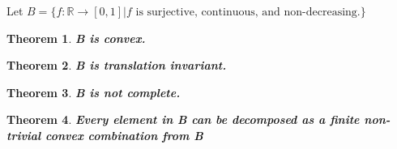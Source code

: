 \documentclass[12pt]{extarticle}
\theoremstyle{plain}
\newtheorem{thm}{Theorem}[section]
\theoremstyle{Definition}
\theoremstyle{Definition}
\theoremstyle{plain}
\begin{document}
	Let $B = \{f : \mathbb{R} \to [0,1] | f \text{ is surjective, continuous, and non-decreasing.}\}$ \\ 
	\begin{thm} \textbf{B is convex. } \\
		
	\end{thm}
	\begin{thm} \textbf{B is translation invariant.} \\
	
	\end{thm}
	\begin{thm} \textbf{B is not complete.} \\
	
	\end{thm}
	\begin{thm} \textbf{Every element in B can be decomposed as a finite non-trivial convex combination from B} \\
	
	\end{thm}
\end{document}
